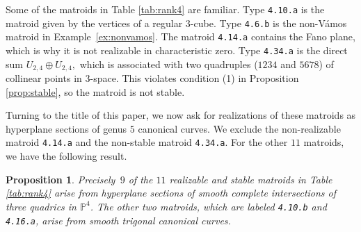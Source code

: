 \documentclass[12pt]{extarticle}
\newtheorem{proposition}[theorem]{Proposition}
\theoremstyle{definition}
\numberwithin{theorem}{section}
\theoremstyle{plain}\newtheorem{ithm}{Theorem}
\newcommand{\PP}{\mathbb{P}}
\begin{document}
Some of the matroids in Table \ref{tab:rank4} are familiar.
Type \texttt{4.10.a} is the matroid given by the vertices of
a regular $3$-cube.
Type \texttt{4.6.b} is the non-V\'amos matroid in Example~\ref{ex:nonvamos}. The matroid \texttt{4.14.a} contains the Fano plane, which is why it is not realizable in characteristic zero.
Type \texttt{4.34.a} is the direct sum $U_{2,4}\oplus U_{2,4},$ which is associated with
 two quadruples ($1234$ and $5678$) of collinear points in $3$-space. 
 This violates condition (1) in Proposition \ref{prop:stable},
     so the matroid is not stable. 

Turning to the title of this paper, we now ask 
 for realizations of these matroids 
as hyperplane sections of genus $5$ canonical curves.
We exclude the non-realizable matroid {\tt 4.14.a} and the non-stable matroid {\tt 4.34.a}.
For the other $11$ matroids, we have the following result.

\begin{proposition} \label{prop:9of12}
Precisely $\,9$ of the $11$ realizable and stable matroids in Table \ref{tab:rank4}
arise from hyperplane sections of smooth complete intersections
of three quadrics in $\PP^4$.
The other two matroids, which are labeled \texttt{4.10.b} and \texttt{4.16.a},  arise 
from smooth trigonal canonical curves. 
\end{proposition}
\end{document}
